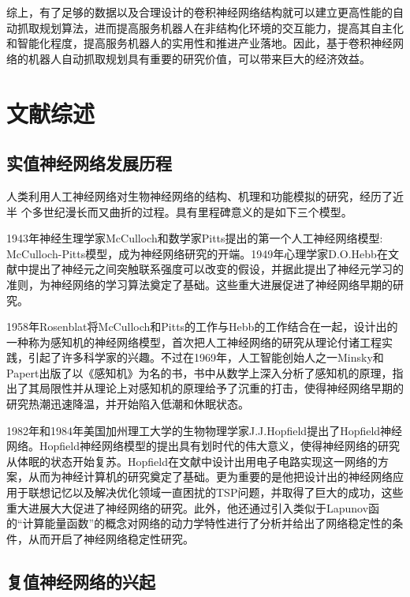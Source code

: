 \documentclass[no-math, withoutpreface]{YangThesis}
\begin{document}
综上，有了足够的数据以及合理设计的卷积神经网络结构就可以建立更高性能的自动抓取规划算法，进而提高服务机器人在非结构化环境的交互能力，提高其自主化和智能化程度，提高服务机器人的实用性和推进产业落地。因此，基于卷积神经网络的机器人自动抓取规划具有重要的研究价值，可以带来巨大的经济效益。

\newpage
\section{文献综述}
\subsection{实值神经网络发展历程}

人类利用人工神经网络对生物神经网络的结构、机理和功能模拟的研究，经历了近半
个多世纪漫长而又曲折的过程。具有里程碑意义的是如下三个模型\cite{bibc1,bibc2}。

1943年神经生理学家McCulloch和数学家Pitts提出的第一个人工神经网络模型:
McCulloch-Pitts模型\cite{bibc3}，成为神经网络研究的开端。1949年心理学家D.O.Hebb在文献\cite{bibc4}中提出了神经元之间突触联系强度可以改变的假设，并据此提出了神经元学习的准则，为神经网络的学习算法奠定了基础。这些重大进展促进了神经网络早期的研究。

1958年Rosenblat将McCulloch和Pitts的工作与Hebb的工作结合在一起，设计出的
一种称为感知机的神经网络模型\cite{bibc5}，首次把人工神经网络的研究从理论付诸工程实践，引起了许多科学家的兴趣。不过在1969年，人工智能创始人之一Minsky和Papert出版了以《感知机》为名的书\cite{bibc6}，书中从数学上深入分析了感知机的原理，指出了其局限性并从理论上对感知机的原理给予了沉重的打击，使得神经网络早期的研究热潮迅速降温，并开始陷入低潮和休眠状态。

1982年和1984年美国加州理工大学的生物物理学家J.J.Hopf\/ield提出了Hopf\/ield神经网络\cite{bibc7,bibc8}。Hopf\/ield神经网络模型的提出具有划时代的伟大意义，使得神经网络的研究从体眠的状态开始复苏。Hopf\/ield在文献\cite{bibc7,bibc8}中设计出用电子电路实现这一网络的方案，从而为神经计算机的研究奠定了基础。更为重要的是他把设计出的神经网络应用于联想记忆以及解决优化领域一直困扰的TSP问题，并取得了巨大的成功，这些重大进展大大促进了神经网络的研究。此外，他还通过引入类似于Lapunov函的“计算能量函数”的概念对网络的动力学特性进行了分析并给出了网络稳定性的条件，从而开启了神经网络稳定性研究。

\subsection{复值神经网络的兴起}
\end{document}
